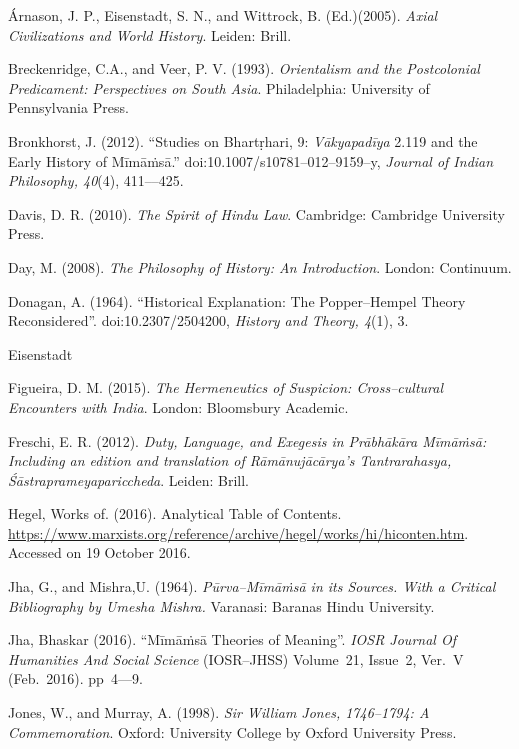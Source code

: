 \begin{thebibliography}{99}
\itemsep=2pt
 Árnason, J. P., Eisenstadt, S. N., and Wittrock, B. (Ed.)(2005). \textit{Axial Civilizations and World History}. Leiden: Brill.

  Breckenridge, C.A., and Veer, P. V. (1993). \textit{Orientalism and the Postcolonial Predicament: Perspectives on South Asia}. Philadelphia: University of Pennsylvania Press.

  Bronkhorst, J. (2012). “Studies on Bhartṛhari, 9: \textit{Vākyapadīya} 2.119 and the Early History of Mīmāṁsā.” doi:10.1007/s10781–012–9159–y, \textit{Journal of Indian Philosophy, 40}(4), 411––425.

  Davis, D. R. (2010). \textit{The Spirit of Hindu Law}. Cambridge: Cambridge University Press.

  Day, M. (2008). \textit{The Philosophy of History: An Introduction}. London: Continuum.

  Donagan, A. (1964). “Historical Explanation: The Popper–Hempel Theory Reconsidered”. doi:10.2307/2504200, \textit{History and Theory, 4}(1), 3.

  Eisenstadt

  Figueira, D. M. (2015). \textit{The Hermeneutics of Suspicion: Cross–cultural Encounters with India}. London: Bloomsbury Academic.

  Freschi, E. R. (2012). \textit{Duty, Language, and Exegesis in Prābhākāra Mīmāṁsā: Including an edition and translation of Rāmānujācārya's Tantrarahasya, Śāstraprameyapariccheda}. Leiden: Brill.

  Hegel, Works of. (2016). Analytical Table of Contents. \url{https://www.marxists.org/reference/archive/hegel/works/hi/hiconten.htm}. Accessed on 19 October 2016.

  Jha, G., and Mishra,U. (1964). \textit{Pūrva–Mīmāṁsā in its Sources. With a Critical Bibliography by Umesha Mishra.} Varanasi: Baranas Hindu University.

  Jha, Bhaskar (2016). “Mīmāṁsā Theories of Meaning”. \textit{IOSR Journal Of Humanities And Social Science} (IOSR–JHSS) Volume~21, Issue~2, Ver.~V (Feb.~2016). pp~4––9.

  Jones, W., and Murray, A. (1998). \textit{Sir William Jones, 1746–1794: A Commemoration}. Oxford: University College by Oxford University Press.


\end{thebibliography}
